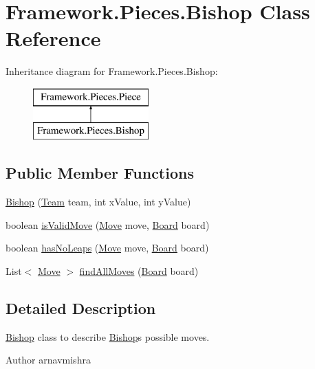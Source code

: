 \hypertarget{class_framework_1_1_pieces_1_1_bishop}{}\section{Framework.\+Pieces.\+Bishop Class Reference}
\label{class_framework_1_1_pieces_1_1_bishop}
Inheritance diagram for Framework.\+Pieces.\+Bishop\+:\begin{figure}[H]
\begin{center}
\leavevmode
\includegraphics[height=2.000000cm]{class_framework_1_1_pieces_1_1_bishop}
\end{center}
\end{figure}
\subsection*{Public Member Functions}
\begin{DoxyCompactItemize}
\item 
\hyperlink{class_framework_1_1_pieces_1_1_bishop_a3396bd8dc296ef4648567b18fdc23639}{Bishop} (\hyperlink{class_framework_1_1_team}{Team} team, int x\+Value, int y\+Value)
\item 
boolean \hyperlink{class_framework_1_1_pieces_1_1_bishop_aaec1c58dd8488e1f3c139a1a99ac67c7}{is\+Valid\+Move} (\hyperlink{class_framework_1_1_move}{Move} move, \hyperlink{class_framework_1_1_board}{Board} board)
\item 
boolean \hyperlink{class_framework_1_1_pieces_1_1_bishop_a62bca5b0d1b6318f91deed40edf0a8fb}{has\+No\+Leaps} (\hyperlink{class_framework_1_1_move}{Move} move, \hyperlink{class_framework_1_1_board}{Board} board)
\item 
List$<$ \hyperlink{class_framework_1_1_move}{Move} $>$ \hyperlink{class_framework_1_1_pieces_1_1_bishop_a0f8de4fc5aad49e30d1bb08c87d67d86}{find\+All\+Moves} (\hyperlink{class_framework_1_1_board}{Board} board)
\end{DoxyCompactItemize}


\subsection{Detailed Description}
\hyperlink{class_framework_1_1_pieces_1_1_bishop}{Bishop} class to describe \hyperlink{class_framework_1_1_pieces_1_1_bishop}{Bishop}\textquotesingle{}s possible moves. \begin{DoxyAuthor}{Author}
arnavmishra 
\end{DoxyAuthor}


